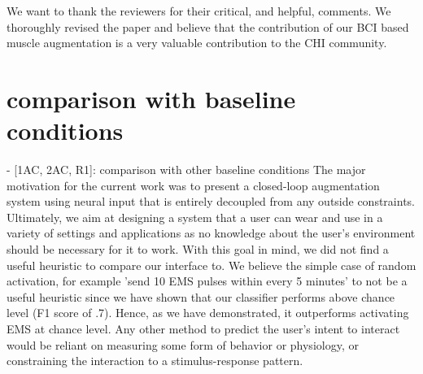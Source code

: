 

We want to thank the reviewers for their critical, and helpful, comments. We thoroughly revised the paper and believe that the contribution of our BCI based muscle augmentation is a very valuable contribution to the CHI community.

\section{comparison with baseline conditions}


- [1AC, 2AC, R1]: comparison with other baseline conditions
The major motivation for the current work was to present a closed-loop augmentation system using neural input that is entirely decoupled from any outside constraints. Ultimately, we aim at designing a system that a user can wear and use in a variety of settings and applications as no knowledge about the user's environment should be necessary for it to work. With this goal in mind, we did not find a useful heuristic to compare our interface to. We believe the simple case of random activation, for example 'send 10 EMS pulses within every 5 minutes' to not be a useful heuristic since we have shown that our classifier performs above chance level (F1 score of .7). Hence, as we have demonstrated, it outperforms activating EMS at chance level. Any other method to predict the user's intent to interact would be reliant on measuring some form of behavior or physiology, or constraining the interaction to a stimulus-response pattern. 


